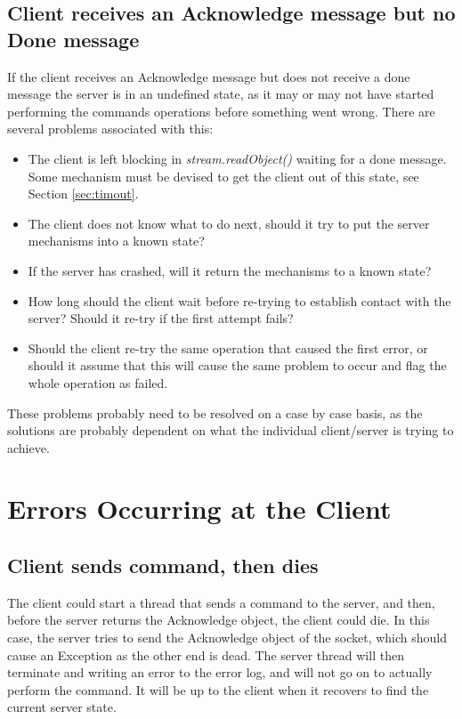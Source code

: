 \documentclass[10pt,a4paper]{article}
\begin{document}
\subsection{Client receives an Acknowledge message but no Done message}
If the client receives an Acknowledge message but does not receive a done message the server is in an undefined
state, as it may or may not have started performing the commands operations before something went wrong. There
are several problems associated with this:
\begin{itemize}
\item The client is left blocking in {\em stream.readObject()} waiting for a done message. Some mechanism
must be devised to get the client out of this state, see Section \ref{sec:timout}.
\item The client does not know what to do next, should it try to put the server mechanisms into a known state?
\item If the server has crashed, will it return the mechanisms to a known state? 
\item How long should the client
wait before re-trying to establish contact with the server? Should it re-try if the first attempt fails?
\item Should the client re-try the same operation that caused the first error, or should it assume that this
will cause the same problem to occur and flag the whole operation as failed.
\end{itemize}

These problems probably need to be resolved on a case by case basis, as the solutions are probably
dependent on what the individual client/server is trying to achieve.


\section{Errors Occurring at the Client}
\subsection{Client sends command, then dies}
The client could start a thread that sends a command to the server, and then, before the server returns the
Acknowledge object, the client could die. In this case, the server tries to send the Acknowledge object of the socket,
which should cause an Exception as the other end is dead. The server thread will then terminate and writing an error to the error log, and will not go on to actually perform the command. It will be up to the client when it recovers
to find the current server state.
\end{document}
